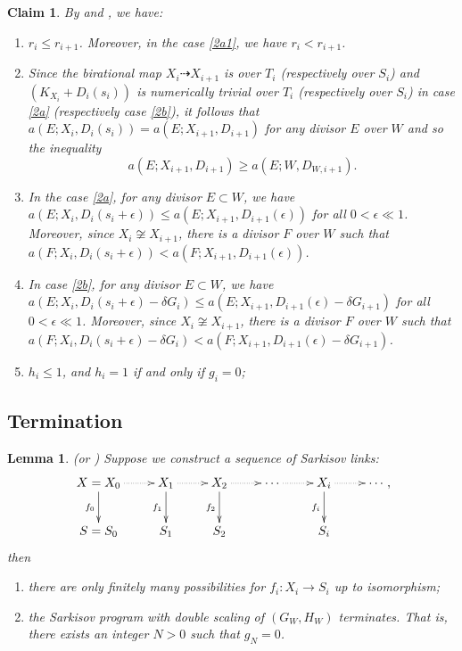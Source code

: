 \documentclass[11pt]{amsart}
\newtheorem{lem}[defn]{Lemma}
\newtheorem{claim}[defn]{Claim}
\begin{document}
\begin{claim}\label{behavior2}
By \cite[Lemma 13.14-17]{haconMinimalModelProgram2012} and \cite[Lemma 4.2]{liuSarkisovProgramGeneralized2021}, we have:
  \begin{enumerate}
    \item $r_{i}\leqslant r_{i+1}$. Moreover, in the case \ref{2a1}, we have $r_{i}<r_{i+1}$. 
    \item Since the birational map $X_{i}\dashrightarrow X_{i+1}$ is over $T_{i}$ (respectively over $S_{i}$) and $(K_{X_{i}}+D_{i}(s_{i}))$ is numerically trivial over $T_{i}$ (respectively over $S_{i}$) in case \ref{2a} (respectively case \ref{2b}), it follows that $a(E;X_{i},D_{i}(s_{i}))= a(E;X_{i+1},D_{i+1})$ for any divisor $E$ over $W$ and so the inequality
    \[
      a(E;X_{i+1},D_{i+1})\geqslant a(E;W,D_{W,i+1}).
    \]
  \item\label{2adicrepancy}  In the case \ref{2a}, for any divisor $E \subset W$, we have $a(E;X_{i},D_{i}(s_{i}+\epsilon))\leqslant a(E;X_{i+1},D_{i+1}(\epsilon))$ for all $0<\epsilon\ll 1$. Moreover, since $X_{i} \not\cong X_{i+1}$, there is a divisor $F$ over $W$ such that  $a(F;X_{i},D_{i}(s_{i}+\epsilon))< a(F;X_{i+1},D_{i+1}(\epsilon))$.

  \item\label{2bdiscrepancy}   In case \ref{2b}, for any divisor $E \subset W$, we have $a(E;X_{i},D_{i}(s_{i}+\epsilon)-\delta G_{i})\leqslant a(E;X_{i+1},D_{i+1}(\epsilon)-\delta G_{i+1})$ for all $0<\epsilon\ll 1$. Moreover, since $X_{i} \not\cong X_{i+1}$, there is a divisor $F$ over $W$ such that  $a(F;X_{i},D_{i}(s_{i}+\epsilon)-\delta G_{i})< a(F;X_{i+1},D_{i+1}(\epsilon)-\delta G_{i+1})$.
  \item  $h_{i}\leqslant 1$, and $h_{i}=1$ if and only if $g_{i}=0$;
  \end{enumerate}
\end{claim}
\subsection{Termination}
\begin{lem}\label{termination2}
\cite[Lemma 13.18-19]{haconMinimalModelProgram2012} (or \cite[Lemma 4.9]{liuSarkisovProgramGeneralized2021}) Suppose we construct a sequence of Sarkisov links: 
\[
  \xymatrix{
    X=X_0\ar@{.>}[r]\ar[d]_{f_0}&X_{1}\ar@{.>}[r]\ar[d]_{f_1}& X_{2}\ar[d]_{f_2}\ar@{.>}[r] &\cdots\ar@{.>}[r]&X_{i}\ar[d]_{f_i}\ar@{.>}[r] &\cdots\\
    S=S_{0}&S_{1} &S_{2}&&S_{i}
  }
,\]
then
  \begin{enumerate}
    \item there are only finitely many possibilities for $f_{i}:X_{i}\to S_{i}$ up to isomorphism;
    \item the Sarkisov program with double scaling of $(G_{W},H_{W})$ terminates. That is, there exists an integer $N>0$ such that $g_{N}=0$.  
  \end{enumerate}
\end{lem}
\end{document}
